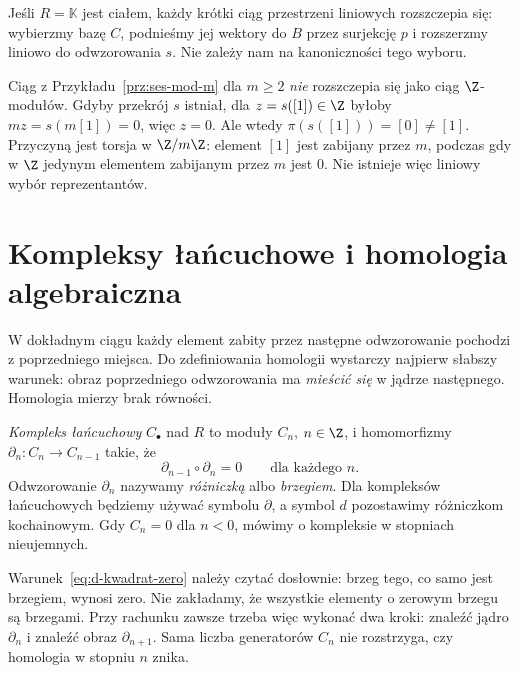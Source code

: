 \begin{uwaga}
Jeśli $R=\mathbb K$ jest ciałem, każdy krótki
ciąg przestrzeni liniowych rozszczepia się:
wybierzmy bazę $C$, podnieśmy jej wektory
do $B$ przez surjekcję $p$ i rozszerzmy
liniowo do odwzorowania $s$. Nie zależy nam na
kanoniczności tego wyboru.

Ciąg z Przykładu~\ref{prz:ses-mod-m} dla
$m\geq2$ \emph{nie} rozszczepia się jako
ciąg $\Z$-modułów. Gdyby przekrój $s$
istniał, dla $z=s([1])\in\Z$ byłoby
$mz=s(m[1])=0$, więc $z=0$.
Ale wtedy $\pi(s([1]))=[0]\ne[1]$.
Przyczyną jest torsja w $\Z/m\Z$: element $[1]$
jest zabijany przez $m$, podczas gdy w $\Z$
jedynym elementem zabijanym przez $m$ jest $0$.
Nie istnieje więc liniowy wybór reprezentantów.
\end{uwaga}
\section{Kompleksy łańcuchowe i homologia algebraiczna}
\label{sec:kompleks-homologia}

W dokładnym ciągu każdy element zabity przez
następne odwzorowanie pochodzi z poprzedniego miejsca.
Do zdefiniowania homologii wystarczy najpierw
słabszy warunek: obraz poprzedniego odwzorowania ma
\emph{mieścić się} w jądrze następnego.
Homologia mierzy brak równości.

\begin{definicja}
\label{def:kompleks-lancuchowy}
\emph{Kompleks łańcuchowy} $C_\bullet$ nad $R$
to moduły $C_n$, $n\in\Z$, i homomorfizmy
$\partial_n:C_n\to C_{n-1}$ takie, że
\begin{equation}\label{eq:d-kwadrat-zero}
 \partial_{n-1}\circ \partial_n=0\qquad\text{dla każdego }n.
\end{equation}
Odwzorowanie $\partial_n$ nazywamy \emph{różniczką} albo
\emph{brzegiem}. Dla kompleksów łańcuchowych
będziemy używać symbolu $\partial$, a symbol $d$
pozostawimy różniczkom kochainowym.
Gdy $C_n=0$ dla $n<0$,
mówimy o kompleksie w stopniach nieujemnych.
\end{definicja}

Warunek~\eqref{eq:d-kwadrat-zero} należy czytać
dosłownie: brzeg tego, co samo jest brzegiem,
wynosi zero. Nie zakładamy, że wszystkie
elementy o zerowym brzegu są brzegami.
Przy rachunku zawsze trzeba więc wykonać dwa kroki:
znaleźć jądro $\partial_n$ i znaleźć obraz
$\partial_{n+1}$. Sama liczba generatorów $C_n$
nie rozstrzyga, czy homologia w stopniu $n$ znika.

